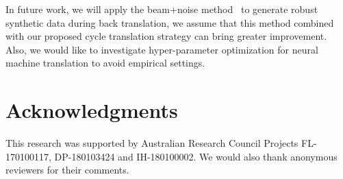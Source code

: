 \documentclass[11pt,a4paper]{article}
\begin{document}
In future work, we will apply the beam+noise method~\cite{edunov2018understanding} to generate robust synthetic data during back translation, we assume that this method combined with our proposed cycle translation strategy can bring greater improvement. Also, we would like to investigate hyper-parameter optimization for neural machine translation to avoid empirical settings.

\section*{Acknowledgments}

This research was supported by Australian Research Council Projects FL-170100117, DP-180103424 and IH-180100002. We would also thank anonymous reviewers for their comments.



\end{document}
